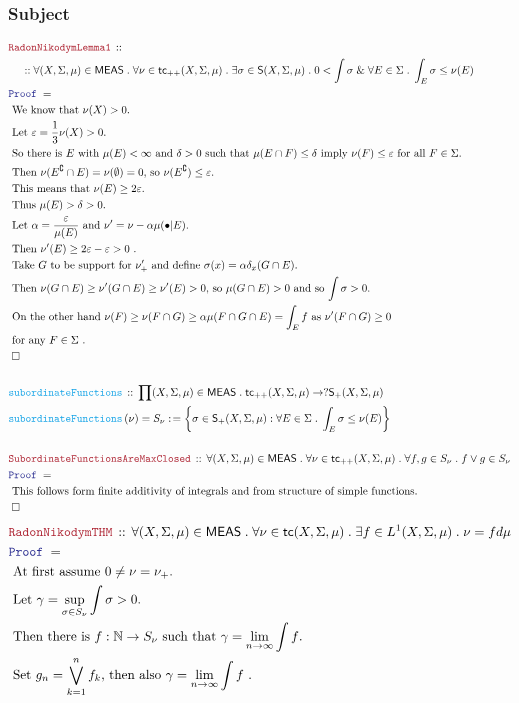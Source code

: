 \documentclass[12pt]{scrartcl}
\newcommand{\FUNC}[1]{\textcolor{Cerulean}{\mathtt{#1}}}
\newcommand{\LOGIC}[1]{\textcolor{Blue}{\mathtt{#1}}}
\newcommand{\THM}[1]{\textcolor{Maroon}{\mathtt{#1}}}
\renewcommand{\.}{\; . \;}
\newcommand{\de}{: \kern 0.1pc =}
\newcommand{\Act}[1]{\left( #1 \right)}
\newcommand{\Theorem}[2]{& \THM{#1} \, :: \, #2 \\ & \Proof = \\ }
\newcommand{\DeclareFunc}[2]{& \FUNC{#1} \, :: \, #2 \\}
\newcommand{\DefineNamedFunc}[4]{&  \FUNC{#1}\Act{#2} = #3 \de #4 \\}
\newcommand{\NewLine}{\\ & \kern 1pc}
\newcommand{\Page}[1]{ \begin{align*} #1 \end{align*}   }
\renewcommand{\And}{\; \& \;}
\newcommand{\Nat}{\mathbb{N} }
\renewcommand{\c}{\complement}
\newcommand{\QED}{\; \square}
\newcommand{\EndProof}{& \QED \\}
\newcommand{\Proof}{\LOGIC{Proof} \; }
\newcommand{\Explain}[1]{& \text{#1.} \\}
\newcommand{\ExplainFurther}[1]{& \text{#1} \\}
\newcommand{\MEAS}{\mathsf{MEAS}}
\newcommand{\Simple}{\mathsf{S}}
\newcommand{\tc}{\mathsf{tc}}
\begin{document}
\subsubsection{Subject}
\Page{
	\Theorem{RadonNikodymLemma1}
	{
		\NewLine ::		
		\forall (X,\Sigma,\mu) \in \MEAS \.
		\forall \nu \in \tc_{++}(X,\Sigma,\mu) \.
		\exists \sigma \in \Simple(X,\Sigma,\mu) \.
		0 < \int \sigma  \And  
		\forall E \in \Sigma \. \int_E \sigma \le \nu(E)  
	}
	\Explain{
		We know that $\nu(X) > 0$}
	\Explain{
		Let $\varepsilon = \frac{1}{3} \nu(X) > 0$}
	\Explain{
		So there is $E$ with $\mu(E) < \infty$	and $\delta > 0$ 
		such that $\mu(E \cap F) \le \delta$ imply $\nu(F) \le \varepsilon$ 
		for all $F \in \Sigma$}
	\Explain{
		Then $\nu(E^\c \cap E) = \nu(\emptyset) = 0$, so $\nu(E^\c) \le \varepsilon$}
	\Explain{
		This means that $\nu(E) \ge 2 \varepsilon$}
	\Explain{
		Thus $\mu(E) > \delta > 0$}
	\Explain{
		Let $\alpha = \frac{\varepsilon}{\mu(E)}$ and $\nu' = \nu - \alpha\mu(\bullet|E)$}
	\Explain{
		Then $\nu'(E) \ge 2 \varepsilon - \varepsilon > 0 $
	}
	\Explain{
		Take $G$ to be support for $\nu'_+$ and define 
		$\sigma(x) = \alpha \delta_x(G \cap E)$}
	\Explain{
		Then $\nu(G \cap E) \ge \nu'(G \cap E) \ge \nu'(E) > 0 $,
		so $\mu(G \cap E)>0$ and so $\int \sigma > 0$}
	\ExplainFurther{
		On the other hand 
		$
			\nu(F) \ge
			\nu(F \cap G) \ge 
			\alpha \mu(F \cap G \cap E) = \int_E f		
		$
		as $\nu'(F \cap G) \ge 0$}
	\Explain{
		for any $F \in \Sigma$
	}
	\EndProof
	\\
	\DeclareFunc{subordinateFunctions}
	{
		\prod (X,\Sigma,\mu) \in \MEAS \.
		\tc_{++}(X,\Sigma,\mu) \to ?\Simple_+(X,\Sigma,\mu)
	}
	\DefineNamedFunc{subordinateFunctions}{\nu}{S_\nu}
	{
		\left\{ \sigma \in \Simple_+(X,\Sigma,\mu) : \forall E \in \Sigma \. \int_E \sigma \le \nu(E)  \right\}
	}
	\\
	\Theorem{SubordinateFunctionsAreMaxClosed}
	{
		\forall (X,\Sigma,\mu) \in \MEAS \.
		\forall \nu \in \tc_{++}(X,\Sigma,\mu) \.
		\forall f,g \in S_\nu \. f \vee g \in S_\nu
	}
	\Explain{
		This follows form finite additivity of integrals and from structure of simple functions}
	\EndProof
}\Page{
	\Theorem{RadonNikodymTHM}
	{
		\forall (X,\Sigma,\mu) \in \MEAS \.
		\forall \nu \in \tc(X,\Sigma,\mu) \.
		\exists f \in L^1(X,\Sigma,\mu) \.
		\nu = fd\mu
	}
	\Explain{ 
		At first assume $0 \neq \nu = \nu_+$}
	\Explain{
		Let  $\gamma = \sup_{\sigma \in S_\nu} \int \sigma > 0$}
	\Explain{
		Then there is $f : \Nat \to S_\nu$ such that $\gamma = \lim_{n \to \infty} \int f$}
	\Explain{
		Set $g_n = \bigvee^n_{k=1} f_k$, then also  $\gamma = \lim_{n \to \infty} \int f$
}}
\end{document}
